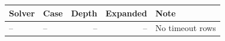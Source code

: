 {\small
\begin{tabular}{L{0.16\textwidth}L{0.18\textwidth}rrL{0.30\textwidth}}
\hline
Solver & Case & Depth & Expanded & Note \\
\hline
-- & -- & -- & -- & No timeout rows \\
\hline
\end{tabular}
}
